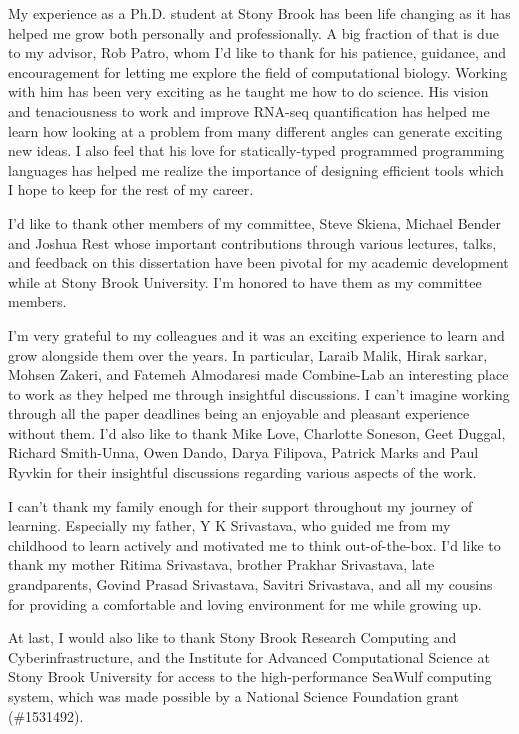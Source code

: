 \documentclass[
12pt, %
oneside, %
english, %
singlespacing, %
liststotoc, %
parskip, %
headsepline, %
]{main} %
\begin{document}
\begin{acknowledgements}
\addchaptertocentry{\acknowledgementname} %

My experience as a Ph.D. student at Stony Brook has been life changing as it has helped me 
grow both personally and professionally. A big fraction of that is due to my advisor, 
Rob Patro, whom I'd like to thank for his patience, guidance, and encouragement for letting 
me explore the field of computational biology.
Working with him has been very exciting as he taught me how to do science. His vision 
and tenaciousness to work and improve RNA-seq quantification has helped me learn
how looking at a problem from many different angles can generate exciting new ideas. I also 
feel that his love for statically-typed programmed programming languages has helped me realize 
the importance of designing efficient tools which I hope to keep for the rest of my career.

I'd like to thank other members of my committee, Steve Skiena, Michael Bender and Joshua Rest whose 
important contributions through various lectures, talks, and feedback on this dissertation have 
been pivotal for my academic development while at Stony Brook University. I'm honored to 
have them as my committee members.

I'm very grateful to my colleagues and it was an exciting experience to learn and grow
alongside them over the years. In particular, Laraib Malik, Hirak sarkar, Mohsen Zakeri, and 
Fatemeh Almodaresi made Combine-Lab an interesting place to work as they helped me 
through insightful discussions. I can't imagine working through all the paper deadlines being
an enjoyable and pleasant experience without them. I'd also like to thank Mike Love, 
Charlotte Soneson, Geet Duggal, Richard Smith-Unna, Owen Dando, Darya Filipova, Patrick Marks 
and Paul Ryvkin for their insightful discussions regarding various aspects of the work.

I can't thank my family enough for their support throughout my journey of learning. 
Especially my father, Y K Srivastava, who guided me from my childhood to learn actively and motivated me 
to think out-of-the-box. I'd like to thank my mother Ritima Srivastava, brother Prakhar Srivastava,
late grandparents, Govind Prasad Srivastava, Savitri Srivastava, and all my cousins
 for providing a comfortable and loving environment for me while growing up. 

At last, I would also like to thank Stony Brook Research Computing and 
Cyberinfrastructure, and the Institute for Advanced Computational Science at Stony Brook 
University for access to the high-performance SeaWulf computing system, which was made 
possible by a National Science Foundation grant (\#1531492).
\end{acknowledgements}
\end{document}
